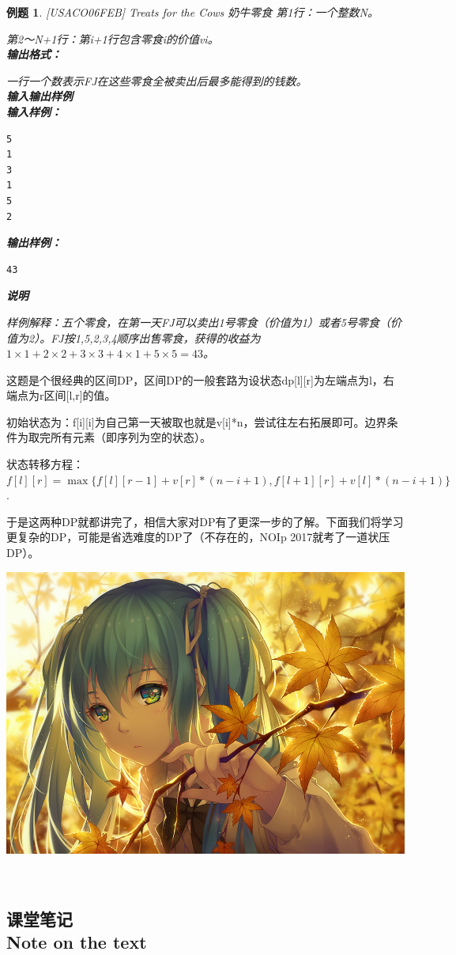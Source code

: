 \documentclass{article}
\newtheorem{example}{例题}[subsection]
\theoremstyle{nonumberplain}
\newcommand{\note}{\ \par


	\subsection*{课堂笔记\\\tiny{Note on the text}}
	\newpage}
\begin{document}
\begin{example}{[USACO06FEB] Treats for the Cows 奶牛零食}
	第1行：一个整数N。

	第2～N+1行：第i+1行包含零食i的价值vi。\\
	\textbf{输出格式：}

	一行一个数表示FJ在这些零食全被卖出后最多能得到的钱数。\\
	\textbf{输入输出样例}\\
	\textbf{输入样例：}

	\begin{verbatim}
5
1
3
1
5
2
\end{verbatim}
	\textbf{输出样例：}
	\begin{verbatim} 
43
\end{verbatim}
	\textbf{说明}

	样例解释：五个零食，在第一天FJ可以卖出1号零食（价值为1）或者5号零食（价值为2）。FJ按1,5,2,3,4顺序出售零食，获得的收益为$1\times 1+2\times 2+3\times 3+4\times 1+5\times 5=43$。
\end{example}

这题是个很经典的区间DP，区间DP的一般套路为设状态dp[l][r]为左端点为l，右端点为r区间[l,r]的值。

初始状态为：f[i][i]为自己第一天被取也就是v[i]*n，尝试往左右拓展即可。边界条件为取完所有元素（即序列为空的状态）。

状态转移方程：$f[l][r]=\max\{f[l][r-1]+v[r]*(n-i+1),f[l+1][r]+v[l]*(n-i+1)\}$.
\ \\ \par
于是这两种DP就都讲完了，相信大家对DP有了更深一步的了解。下面我们将学习更复杂的DP，可能是省选难度的DP了（不存在的，NOIp 2017就考了一道状压DP）。
\begin{center}\includegraphics[scale=0.8]{47046948_p0.png}\end{center}
\note
\end{document}
